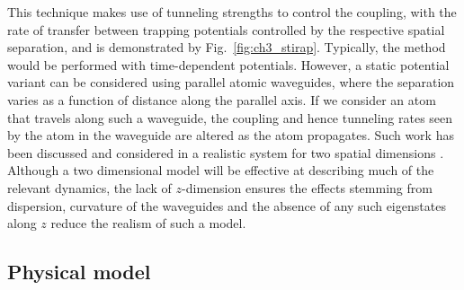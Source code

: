 This technique makes use of tunneling strengths to control the coupling, with the rate of transfer between trapping potentials controlled by the respective spatial separation, and is demonstrated by Fig.~\ref{fig:ch3_stirap}. Typically, the method would be performed with time-dependent potentials. However, a static potential variant can be considered using parallel atomic waveguides, where the separation varies as a function of distance along the parallel axis. If we consider an atom that travels along such a waveguide, the coupling and hence tunneling rates seen by the atom in the waveguide are altered as the atom propagates. Such work has been discussed and considered in a realistic system for two spatial dimensions \cite{OSullivan:10}. Although a two dimensional model will be effective at describing much of the relevant dynamics, the lack of $z$-dimension ensures the effects stemming from dispersion, curvature of the waveguides and the absence of any such eigenstates along $z$ reduce the realism of such a model.

\subsection{Physical model}

